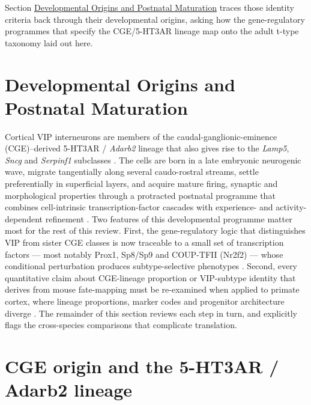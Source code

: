 \documentclass[11pt]{article}
\begin{document}
Section \href{/development}{Developmental Origins and Postnatal Maturation} traces those identity criteria back through their developmental origins, asking how the gene-regulatory programmes that specify the CGE/5-HT3AR lineage map onto the adult t-type taxonomy laid out here.


\section{Developmental Origins and Postnatal Maturation}
\label{sec:03_development}

Cortical VIP interneurons are members of the caudal-ganglionic-eminence (CGE)--derived 5-HT3AR / \textit{Adarb2} lineage that also gives rise to the \textit{Lamp5}, \textit{Sncg} and \textit{Serpinf1} subclasses \citep{Lee2010, Miyoshi2010, Tasic2018}. The cells are born in a late embryonic neurogenic wave, migrate tangentially along several caudo-rostral streams, settle preferentially in superficial layers, and acquire mature firing, synaptic and morphological properties through a protracted postnatal programme that combines cell-intrinsic transcription-factor cascades with experience- and activity-dependent refinement \citep{Miyoshi2010, Miyoshi2015, Lim2018, Demarcogarcia2025}. Two features of this developmental programme matter most for the rest of this review. First, the gene-regulatory logic that distinguishes VIP from sister CGE classes is now traceable to a small set of transcription factors --- most notably Prox1, Sp8/Sp9 and COUP-TFII (Nr2f2) --- whose conditional perturbation produces subtype-selective phenotypes \citep{Miyoshi2015, Stachniak2021, Wei2019, Kanatani2008}. Second, every quantitative claim about CGE-lineage proportion or VIP-subtype identity that derives from mouse fate-mapping must be re-examined when applied to primate cortex, where lineage proportions, marker codes and progenitor architecture diverge \citep{Hodge2019, Hansen2013, Ma2013, Marin2025}. The remainder of this section reviews each step in turn, and explicitly flags the cross-species comparisons that complicate translation.

\section{CGE origin and the 5-HT3AR / Adarb2 lineage}\label{sec-development-lineage}
\end{document}
